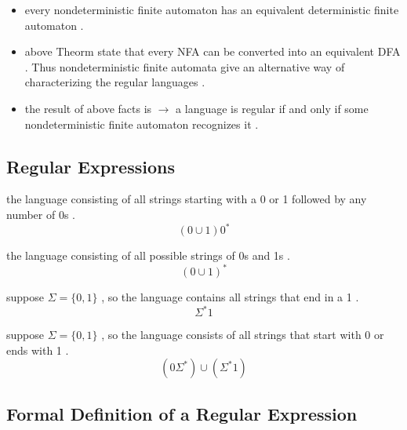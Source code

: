 \documentclass[12pt]{article}
\begin{document}
\begin{tcolorbox}
\begin{itemize}
	\item every nondeterministic finite automaton has an equivalent deterministic finite automaton .
\end{itemize}
\end{tcolorbox}



\begin{tcolorbox}
\begin{itemize}
	\item above Theorm state that every NFA can be converted into an equivalent DFA . Thus nondeterministic finite automata give an alternative way of characterizing the regular languages . 
\end{itemize}
\end{tcolorbox}



\begin{tcolorbox}
\begin{itemize}
	\item the result of above facts is $\to$ a language is regular if and only if some nondeterministic finite automaton recognizes it .
\end{itemize}
\end{tcolorbox}



\subsection{Regular Expressions}


the language consisting of all strings starting with a 0 or 1 followed by any number of 0s .
$$
( 0 \cup 1 ) 0^{*}
$$


\noindent
the language consisting of all possible strings of 0s and 1s .
$$
( 0 \cup 1 )^{*}
$$



\noindent
suppose $\Sigma = \{ 0 , 1 \}$ , so the language contains all strings that end in a 1 .
$$
\Sigma^{*}1
$$

\noindent
suppose $\Sigma = \{ 0 , 1 \}$ , so the language consists of all strings that start with 0 or ends with 1 .
$$
( 0\Sigma^{*} ) \cup ( \Sigma^{*}1 )
$$


\subsection{Formal Definition of a Regular Expression}
\end{document}
